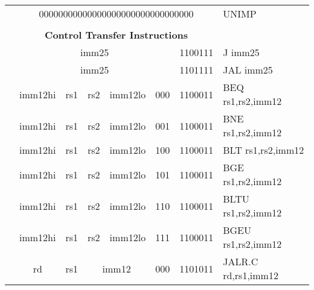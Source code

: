 \begin{table}[p]
\begin{small}
\begin{center}
\begin{tabular}{rccccccccccl}
&
\multicolumn{10}{|c|}{00000000000000000000000000000000} & UNIMP \\
\cline{2-11}
  

&
\multicolumn{10}{c}{} & \\
&
\multicolumn{10}{c}{\bf Control Transfer Instructions} & \\
\cline{2-11}
  

&
\multicolumn{9}{|c|}{imm25} &
\multicolumn{1}{c|}{1100111} & J imm25 \\
\cline{2-11}
  

&
\multicolumn{9}{|c|}{imm25} &
\multicolumn{1}{c|}{1101111} & JAL imm25 \\
\cline{2-11}
  

&
\multicolumn{1}{|c|}{imm12hi} &
\multicolumn{1}{c|}{rs1} &
\multicolumn{1}{c|}{rs2} &
\multicolumn{4}{c|}{imm12lo} &
\multicolumn{2}{c|}{000} &
\multicolumn{1}{c|}{1100011} & BEQ rs1,rs2,imm12 \\
\cline{2-11}
  

&
\multicolumn{1}{|c|}{imm12hi} &
\multicolumn{1}{c|}{rs1} &
\multicolumn{1}{c|}{rs2} &
\multicolumn{4}{c|}{imm12lo} &
\multicolumn{2}{c|}{001} &
\multicolumn{1}{c|}{1100011} & BNE rs1,rs2,imm12 \\
\cline{2-11}
  

&
\multicolumn{1}{|c|}{imm12hi} &
\multicolumn{1}{c|}{rs1} &
\multicolumn{1}{c|}{rs2} &
\multicolumn{4}{c|}{imm12lo} &
\multicolumn{2}{c|}{100} &
\multicolumn{1}{c|}{1100011} & BLT rs1,rs2,imm12 \\
\cline{2-11}
  

&
\multicolumn{1}{|c|}{imm12hi} &
\multicolumn{1}{c|}{rs1} &
\multicolumn{1}{c|}{rs2} &
\multicolumn{4}{c|}{imm12lo} &
\multicolumn{2}{c|}{101} &
\multicolumn{1}{c|}{1100011} & BGE rs1,rs2,imm12 \\
\cline{2-11}
  

&
\multicolumn{1}{|c|}{imm12hi} &
\multicolumn{1}{c|}{rs1} &
\multicolumn{1}{c|}{rs2} &
\multicolumn{4}{c|}{imm12lo} &
\multicolumn{2}{c|}{110} &
\multicolumn{1}{c|}{1100011} & BLTU rs1,rs2,imm12 \\
\cline{2-11}
  

&
\multicolumn{1}{|c|}{imm12hi} &
\multicolumn{1}{c|}{rs1} &
\multicolumn{1}{c|}{rs2} &
\multicolumn{4}{c|}{imm12lo} &
\multicolumn{2}{c|}{111} &
\multicolumn{1}{c|}{1100011} & BGEU rs1,rs2,imm12 \\
\cline{2-11}
  

&
\multicolumn{1}{|c|}{rd} &
\multicolumn{1}{c|}{rs1} &
\multicolumn{5}{c|}{imm12} &
\multicolumn{2}{c|}{000} &
\multicolumn{1}{c|}{1101011} & JALR.C rd,rs1,imm12 \\
\cline{2-11}
  


\end{tabular}
\end{center}
\end{small}
\end{table}

